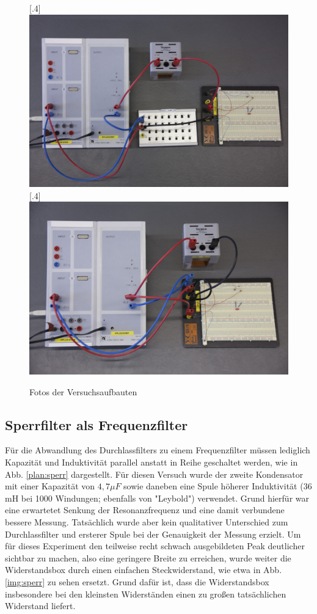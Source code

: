 \begin{figure}[h]
\centering
    [.4\linewidth]
            {\includegraphics[width=.4\textwidth]{images/durchlassfilter.jpg}}
    [.4\linewidth]
            {\includegraphics[width=.4\textwidth]{images/sperrfilter.jpg}}
\caption{Fotos der Versuchsaufbauten}
\end{figure}

\subsection{Sperrfilter als Frequenzfilter}
Für die Abwandlung des Durchlassfilters zu einem Frequenzfilter müssen lediglich Kapazität und Induktivität parallel anstatt in Reihe geschaltet werden, wie in Abb. \ref{plan:sperr} dargestellt. Für diesen Versuch wurde der zweite Kondensator mit einer Kapazität von $ 4,7 \mu F $ sowie daneben eine Spule höherer Induktivität (36 mH bei 1000 Windungen; ebenfalls von "Leybold") verwendet. Grund hierfür war eine erwartetet Senkung der Resonanzfrequenz und eine damit verbundene bessere Messung. Tatsächlich wurde aber kein qualitativer Unterschied zum Durchlassfilter und ersterer Spule 
bei der Genauigkeit der Messung erzielt. Um für dieses Experiment den teilweise recht schwach ausgebildeten Peak deutlicher sichtbar zu machen, also eine geringere Breite zu erreichen, wurde weiter die Widerstandsbox durch einen einfachen Steckwiderstand, wie etwa in Abb. \ref{img:sperr} zu sehen
ersetzt. Grund dafür ist, dass die Widerstandsbox insbesondere bei den kleinsten Widerständen einen zu großen tatsächlichen Widerstand liefert.



